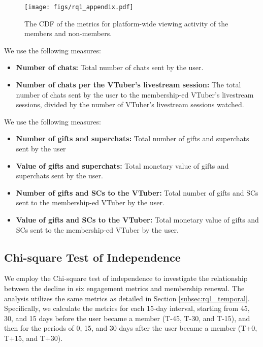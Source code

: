 \begin{figure}[h!]
    \centering
    \texttt{[image: figs/rq1\_appendix.pdf]}
    \caption{The CDF of the metrics for platform-wide viewing activity of the members and non-members.}
    \label{fig:rq1_appendix}
\end{figure}


We use the following measures:


\begin{itemize}[leftmargin=*]
    \item \textbf{Number of chats:} Total number of chats sent by the user.
    \item \textbf{Number of chats per the VTuber's livestream session:} The total number of chats sent by the user to the membership-ed VTuber's livestream sessions, divided by the number of VTuber's livestream sessions watched.
    
\end{itemize}

We use the following measures:

\begin{itemize}[leftmargin=*]
    \item \textbf{Number of gifts and superchats:} Total number of gifts and superchats sent by the user
    \item \textbf{Value of gifts and superchats:} Total monetary value of gifts and superchats sent by the user.
    \item \textbf{Number of gifts and SCs to the VTuber:}
    Total number of gifts and SCs sent to the membership-ed VTuber by the user. 
    \item \textbf{Value of gifts and SCs to the VTuber:}
    Total monetary value of gifts and SCs sent to the membership-ed VTuber by the user.
\end{itemize}


\subsection{Chi-square Test of Independence}
\label{subsec:appendix_chi_square}

We employ the Chi-square test of independence to investigate the relationship between the decline in six engagement metrics and membership renewal.
% 
The analysis utilizes the same metrics as detailed in Section \ref{subsec:rq1_temporal}. Specifically, we calculate the metrics for each 15-day interval, starting from 45, 30, and 15 days before the user became a member (T-45, T-30, and T-15), and then for the periods of 0, 15, and 30 days after the user became a member (T+0, T+15, and T+30).

